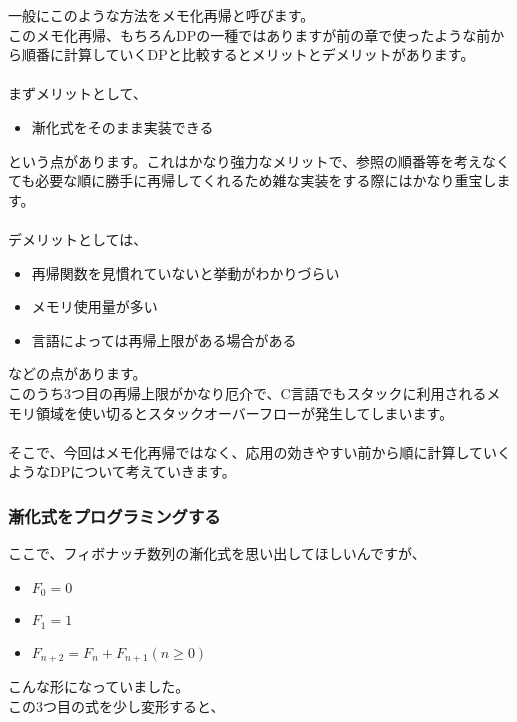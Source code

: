 \noindent
一般にこのような方法をメモ化再帰と呼びます。\\
このメモ化再帰、もちろんDPの一種ではありますが前の章で使ったような前から順番に計算していくDPと比較するとメリットとデメリットがあります。
\\ \\ \noindent
まずメリットとして、

\begin{itemize}
    \item 漸化式をそのまま実装できる
\end{itemize}

\noindent
という点があります。これはかなり強力なメリットで、参照の順番等を考えなくても必要な順に勝手に再帰してくれるため雑な実装をする際にはかなり重宝します。
\\ \\ \noindent
デメリットとしては、

\begin{itemize}
    \item 再帰関数を見慣れていないと挙動がわかりづらい
    \item メモリ使用量が多い
    \item 言語によっては再帰上限がある場合がある
\end{itemize}

\noindent
などの点があります。\\
このうち3つ目の再帰上限がかなり厄介で、C言語でもスタックに利用されるメモリ領域を使い切るとスタックオーバーフローが発生してしまいます。
\\ \\ \noindent
そこで、今回はメモ化再帰ではなく、応用の効きやすい前から順に計算していくようなDPについて考えていきます。

\clearpage

\subsubsection{漸化式をプログラミングする}

\noindent
ここで、フィボナッチ数列の漸化式を思い出してほしいんですが、

\begin{itemize}
    \item $F_0 = 0$
    \item $F_1 = 1$
    \item $F_{n+2} = F_{n} + F_{n+1}(n \geq 0)$
\end{itemize}

\noindent
こんな形になっていました。\\
この3つ目の式を少し変形すると、

